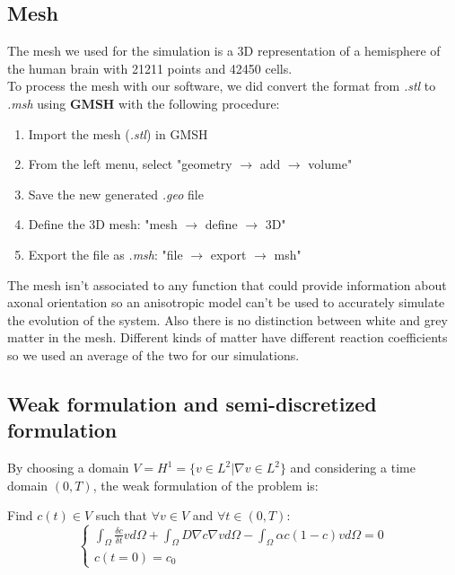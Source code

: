 \documentclass[12pt, letterpaper]{article}
\begin{document}
\subsection{Mesh}
The mesh we used for the simulation is a 3D representation of a hemisphere of the human brain with 21211 points and 42450 cells.\\
To process the mesh with our software, we did convert the format from \textit{.stl} to \textit{.msh} using \textbf{GMSH} with the following procedure:
\begin{enumerate}
    \item Import the mesh (\textit{.stl}) in GMSH
    \item From the left menu, select "geometry $\rightarrow$ add $\rightarrow$ volume"
    \item Save the new generated \textit{.geo} file
    \item Define the 3D mesh: "mesh $\rightarrow$ define $\rightarrow$ 3D"
    \item Export the file as \textit{.msh}: "file $\rightarrow$ export $\rightarrow$ msh"
\end{enumerate}

\noindent The mesh isn't associated to any function that could provide information about axonal orientation so an anisotropic model can't be used to accurately simulate the evolution of the system.
\noindent Also there is no distinction between white and grey matter in the mesh. Different kinds of matter have different reaction coefficients so we used an average of the two for our simulations. 

\subsection{Weak formulation and semi-discretized formulation}
By choosing a domain $V=H^1=\{v\in L^2|\nabla v\in L^2\}$ and considering a time domain $(0, T)$, the weak formulation of the problem is:

\vspace{1em}
\noindent Find $c(t)\in V$ such that $\forall v\in V$ and $\forall t\in(0,T)$:
$$\begin{cases}\int_\Omega\frac{\delta c}{\delta t}vd\Omega+\int_\Omega D\nabla c\nabla vd\Omega-\int_\Omega\alpha c(1-c)vd\Omega=0\\c(t=0)=c_0\end{cases}$$
\end{document}
